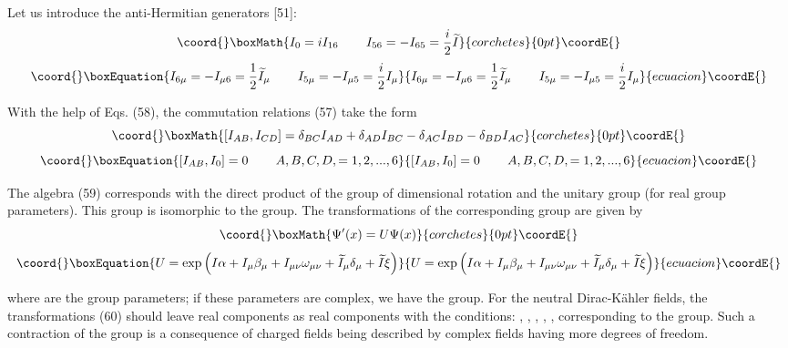 \documentclass[a4paper,12pt]{article}
\begin{document}
Let us introduce the anti-Hermitian generators [51]:
\[\coord{}\boxMath{
I_0=iI_{16}\hspace{0.3in}I_{56}=-I_{65}=\frac i2\widetilde{I}
}{corchetes}{0pt}\coordE{}\]
\begin{equation}\coord{}\boxEquation{
I_{6\mu }=-I_{\mu 6}=\frac 12\widetilde{I}_\mu \hspace{0.3in}I_{5\mu
}=-I_{\mu 5}=\frac i2I_\mu  \label{58}
}{
I_{6\mu }=-I_{\mu 6}=\frac 12\widetilde{I}_\mu \hspace{0.3in}I_{5\mu
}=-I_{\mu 5}=\frac i2I_\mu  }{ecuacion}\coordE{}\end{equation}

With the help of Eqs. (58), the commutation relations (57) take the form
\[\coord{}\boxMath{
\left[ I_{AB},I_{CD}\right] =\delta _{BC}I_{AD}+\delta _{AD}I_{BC}-\delta
_{AC}I_{BD}-\delta _{BD}I_{AC}
}{corchetes}{0pt}\coordE{}\]
\begin{equation}\coord{}\boxEquation{
\left[ I_{AB},I_0\right] =0\hspace{0.3in}A,B,C,D,=1, 2,...,6
\label{59}
}{
\left[ I_{AB},I_0\right] =0\hspace{0.3in}A,B,C,D,=1, 2,...,6
}{ecuacion}\coordE{}\end{equation}

The algebra (59) corresponds with the direct product of the group
of \coordHE{} dimensional rotation \coordHE{} and the unitary group
\coordHE{} (for real group parameters). This group is isomorphic to
the \coordHE{} group. The transformations of the corresponding group
are given by
\[\coord{}\boxMath{
\Psi ^{\prime }(x)=U\Psi (x)
}{corchetes}{0pt}\coordE{}\]
\begin{equation}\coord{}\boxEquation{
U=\exp \left( I\alpha +I_\mu \beta _\mu +I_{\mu \nu }\omega _{\mu
\nu }+ \widetilde{I}_\mu \delta _\mu +\widetilde{I}\xi \right)
\label{60}
}{
U=\exp \left( I\alpha +I_\mu \beta _\mu +I_{\mu \nu }\omega _{\mu
\nu }+ \widetilde{I}_\mu \delta _\mu +\widetilde{I}\xi \right)
}{ecuacion}\coordE{}\end{equation}

where \myHighlight{$\alpha ,$}\coordHE{}  \myHighlight{$\beta _\mu ,$}\coordHE{}  \myHighlight{$\omega _{\mu \nu },$}\coordHE{}  \myHighlight{$\delta _\mu
,$}\coordHE{}  \myHighlight{$\xi $}\coordHE{} are the group parameters; if these parameters are
complex, we have the \coordHE{} group. For the neutral
Dirac-K\"ahler fields, the transformations (60) should leave real
components as real components with the conditions: \myHighlight{$ \alpha
^{*}=\alpha $}\coordHE{}, \coordHE{}, \coordHE{},
\coordHE{}, \coordHE{}, \coordHE{}  \coordHE{}  \myHighlight{$\xi ^{*}=-\xi $}\coordHE{} corresponding to the \coordHE{}
group. Such a contraction of the \coordHE{} group is a consequence
of charged fields being described by complex fields having more
degrees of freedom.
\end{document}
